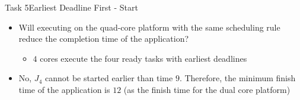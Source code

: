 \begin{frame}[allowframebreaks]{Task 5}{Earliest Deadline First - Start\vspace{0.5cm}}
  \begin{tasknoinc}
    \begin{itemize}
      \item Will executing on the \alert{quad-core platform} with the same scheduling rule reduce the completion time of the application?
        \begin{itemize}
          \item $4$ cores execute the four ready tasks with earliest deadlines
        \end{itemize}
    \end{itemize}
  \end{tasknoinc}
  \begin{solution}
    \begin{itemize}
      \item No, $J_4$ cannot be started earlier than time $9$. Therefore, the minimum finish time of the application is $12$ (as the finish time for the dual core platform)
    \end{itemize}
  \end{solution}
\end{frame}
